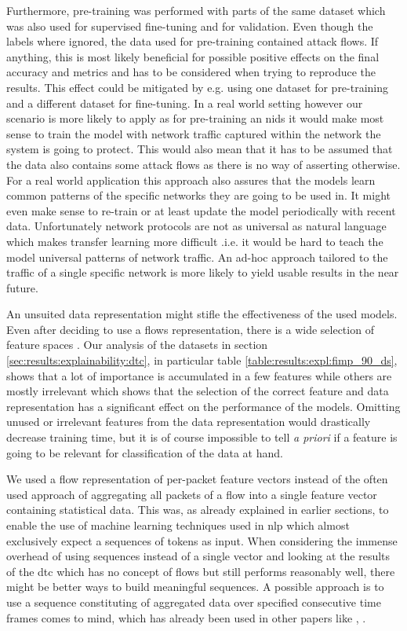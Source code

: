 Furthermore, pre-training was performed with parts of the same dataset which was also used for supervised fine-tuning and for validation. Even though the labels where ignored, the data used for pre-training contained attack flows. If anything, this is most likely beneficial for possible positive effects on the final accuracy and metrics and has to be considered when trying to reproduce the results. This effect could be mitigated by e.g. using one dataset for pre-training and a different dataset for fine-tuning. In a real world setting however our scenario is more likely to apply as for pre-training an \gls{nids} it would make most sense to train the model with network traffic captured within the network the system is going to protect. This would also mean that it has to be assumed that the data also contains some attack flows as there is no way of asserting otherwise. For a real world application this approach also assures that the models learn common patterns of the specific networks they are going to be used in. It might even make sense to re-train or at least update the model periodically with recent data. Unfortunately network protocols are not as universal as natural language which makes transfer learning more difficult .i.e. it would be hard to teach the model universal patterns of network traffic. An ad-hoc approach tailored to the traffic of a single specific network is more likely to yield usable results in the near future. \par

An unsuited data representation might stifle the effectiveness of the used models. Even after deciding to use a flows representation, there is a wide selection of feature spaces \cite{feature_vectors}.
Our analysis of the datasets in section \ref{sec:results:explainability:dtc}, in particular table \ref{table:results:expl:fimp_90_ds}, shows that a lot of importance is accumulated in a few features while others are mostly irrelevant which shows that the selection of the correct feature and data representation has a significant effect on the performance of the models. Omitting unused or irrelevant features from the data representation would drastically decrease training time, but it is of course impossible to tell \textit{a priori} if a feature is going to be relevant for classification of the data at hand. \par
We used a flow representation of per-packet feature vectors instead of the often used approach of aggregating all packets of a flow into a single feature vector containing statistical data. This was, as already explained in earlier sections, to enable the use of machine learning techniques used in \gls{nlp} which almost exclusively expect a sequences of tokens as input. When considering the immense overhead of using sequences instead of a single vector and looking at the results of the \gls{dtc} which has no concept of flows but still performs reasonably well, there might be better ways to build meaningful sequences. A possible approach is to use a sequence constituting of aggregated data over specified consecutive time frames comes to mind, which has already been used in other papers like \cite{attention_model_ids}, \cite{kitsune}. \par

